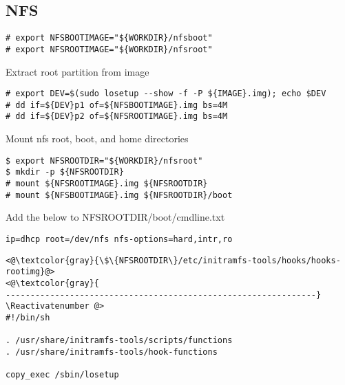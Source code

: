 \label{sec:testbed_nfs}


\subsection{NFS}


\begin{lstlisting}[]
# export NFSBOOTIMAGE="${WORKDIR}/nfsboot"
# export NFSROOTIMAGE="${WORKDIR}/nfsroot"
\end{lstlisting}
\FloatBarrier
\vspace{-5mm}

Extract root partition from image
\begin{lstlisting}[]
# export DEV=$(sudo losetup --show -f -P ${IMAGE}.img); echo $DEV
# dd if=${DEV}p1 of=${NFSBOOTIMAGE}.img bs=4M
# dd if=${DEV}p2 of=${NFSROOTIMAGE}.img bs=4M
\end{lstlisting}
\FloatBarrier
\vspace{-5mm}


Mount nfs root, boot, and home directories
\begin{lstlisting}[]
$ export NFSROOTDIR="${WORKDIR}/nfsroot"
$ mkdir -p ${NFSROOTDIR}
# mount ${NFSROOTIMAGE}.img ${NFSROOTDIR}
# mount ${NFSBOOTIMAGE}.img ${NFSROOTDIR}/boot
\end{lstlisting}
\FloatBarrier
\vspace{-5mm}


Add the below to NFSROOTDIR/boot/cmdline.txt
\begin{lstlisting}[]
ip=dhcp root=/dev/nfs nfs-options=hard,intr,ro
\end{lstlisting}
\FloatBarrier
\vspace{-5mm}


\Suppressnumber\begin{lstlisting}[]
<@\textcolor{gray}{\$\{NFSROOTDIR\}/etc/initramfs-tools/hooks/hooks-rootimg}@>
<@\textcolor{gray}{
---------------------------------------------------------------}
\Reactivatenumber @>
#!/bin/sh

. /usr/share/initramfs-tools/scripts/functions
. /usr/share/initramfs-tools/hook-functions

copy_exec /sbin/losetup
\end{lstlisting}
\FloatBarrier
\vspace{-5mm}


